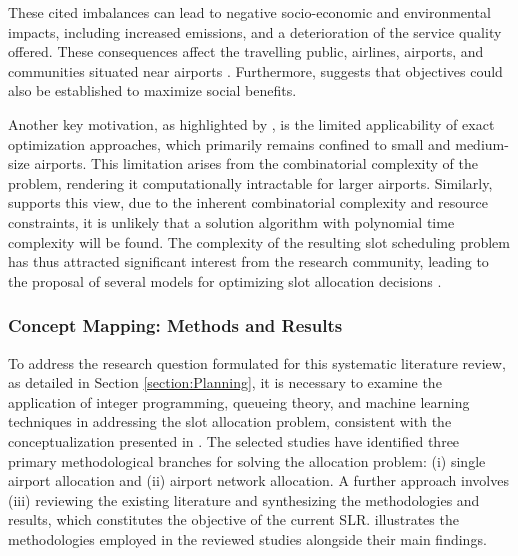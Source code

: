 These cited imbalances can lead to negative socio-economic and environmental impacts, including increased emissions, and a deterioration of the service quality offered. These consequences affect the travelling public, airlines, airports, and communities situated near airports \cite{keskin_optimal_2023}. Furthermore,  suggests that objectives could also be established to maximize social benefits.

Another key motivation, as highlighted by , is the limited applicability of exact optimization approaches, which primarily remains confined to small and medium-size airports. This limitation arises from the combinatorial complexity of the problem, rendering it computationally intractable for larger airports. Similarly,  supports this view, due to the inherent combinatorial complexity and resource constraints, it is unlikely that a solution algorithm with polynomial time complexity will be found. The complexity of the resulting slot scheduling problem has thus attracted significant interest from the research community, leading to the proposal of several models for optimizing slot allocation decisions \cite{jiang_decision_2021}.

\subsubsection{Concept Mapping: Methods and Results}

To address the research question formulated for this systematic literature review, as detailed in Section \ref{section:Planning}, it is necessary to examine the application of integer programming, queueing theory, and machine learning techniques in addressing the slot allocation problem, consistent with the conceptualization presented in . The selected studies have identified three primary methodological branches for solving the allocation problem: (i) single airport allocation and (ii) airport network allocation. A further approach involves (iii) reviewing the existing literature and synthesizing the methodologies and results, which constitutes the objective of the current \acrfull{SLR}.  illustrates the methodologies employed in the reviewed studies alongside their main findings.

%

